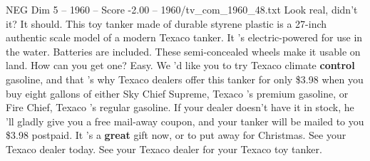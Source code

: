 \begin{textsample}{NEG Dim 5 – 1960 – Score -2.00 – 1960/tv\_com\_1960\_48.txt}  \label{ex:f5_neg_014}
Look real, didn't it?
It should.
This toy tanker made of durable styrene plastic is a 27-inch authentic scale model of a modern Texaco tanker.
It 's electric-powered for use in the water.
Batteries are included.
These semi-concealed wheels make it usable on land.
How can you get one?
Easy.
We 'd like you to try Texaco climate \textbf{control} gasoline, and that 's why Texaco dealers offer this tanker for only \$3.98 when you buy eight gallons of either Sky Chief Supreme, Texaco 's premium gasoline, or Fire Chief, Texaco 's regular gasoline.
If your dealer doesn't have it in stock, he 'll gladly give you a free mail-away coupon, and your tanker will be mailed to you \$3.98 postpaid.
It 's a \textbf{great} gift now, or to put away for Christmas.
See your Texaco dealer today.
See your Texaco dealer for your Texaco toy tanker.

\end{textsample}
